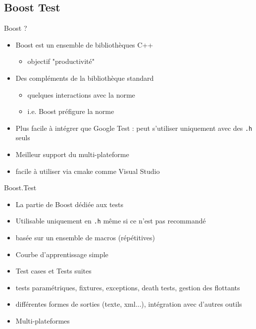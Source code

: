 \subsection{Boost Test}
\label{sec:boost:test}


\begin{frame}{Boost ?}
\begin{itemize}
\item Boost est un ensemble de bibliothèques C++
\begin{itemize}
\item objectif "productivité"
\end{itemize}
\item Des compléments de la bibliothèque standard
\begin{itemize}
\item quelques interactions avec la norme
\item i.e. Boost préfigure la norme
\end{itemize}
\item Plus facile à intégrer que Google Test : peut s'utiliser uniquement avec des \texttt{.h} seuls
\item Meilleur support du multi-plateforme
\item facile à utiliser via cmake comme Visual Studio
\end{itemize}
\end{frame}

\begin{frame}{Boost.Test}
\begin{itemize}
\item La partie de Boost dédiée aux tests
\item Utilisable uniquement en \texttt{.h} même si ce n'est pas recommandé
\item basée sur un ensemble de macros (répétitives)
\item Courbe d'apprentissage simple
\item Test cases et Tests suites
\item tests paramétriques, fixtures, exceptions, death tests, gestion des flottants
\item différentes formes de sorties (texte, xml...), intégration avec d'autres outils
\item Multi-plateformes
\end{itemize}
\end{frame}

